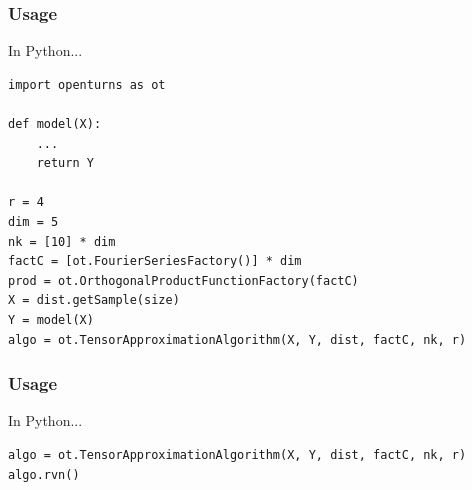 \documentclass{beamer}
\begin{document}
\begin{frame}[containsverbatim]
  \frametitle{Usage}
  \begin{block}{In Python...}
\begin{lstlisting}
import openturns as ot

def model(X):
    ...
    return Y

r = 4
dim = 5
nk = [10] * dim
factC = [ot.FourierSeriesFactory()] * dim
prod = ot.OrthogonalProductFunctionFactory(factC)
X = dist.getSample(size)
Y = model(X)
algo = ot.TensorApproximationAlgorithm(X, Y, dist, factC, nk, r)
\end{lstlisting}
  \end{block}
\end{frame}


\begin{frame}[containsverbatim]
  \frametitle{Usage}
  \begin{block}{In Python...}
\begin{lstlisting}
algo = ot.TensorApproximationAlgorithm(X, Y, dist, factC, nk, r)
algo.rvn()
\end{lstlisting}
  \end{block}
\end{frame}
% 
% 
% 
\end{document}
